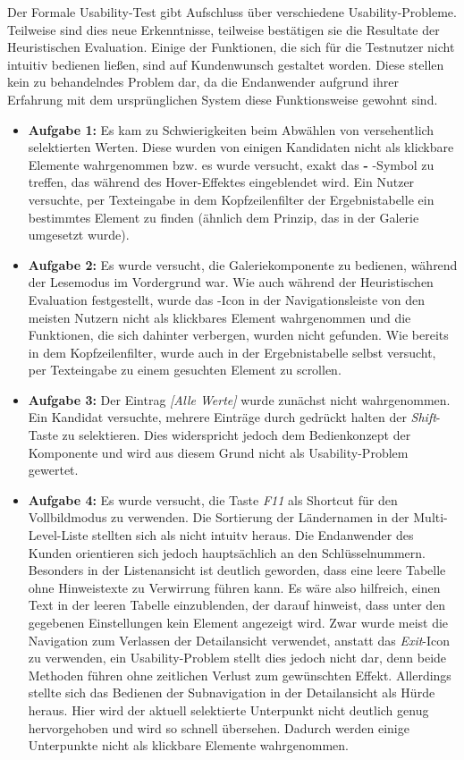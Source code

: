Der Formale Usability-Test gibt Aufschluss über verschiedene Usability-Probleme. Teilweise sind dies neue Erkenntnisse, teilweise bestätigen sie die Resultate der Heuristischen Evaluation. Einige der Funktionen, die sich für die Testnutzer nicht intuitiv bedienen ließen, sind auf Kundenwunsch gestaltet worden. Diese stellen kein zu behandelndes Problem dar, da die Endanwender aufgrund ihrer Erfahrung mit dem ursprünglichen System diese Funktionsweise gewohnt sind.\par
\begin{itemize}
\item \textbf{Aufgabe 1:} Es kam zu Schwierigkeiten beim Abwählen von versehentlich selektierten Werten. Diese wurden von einigen Kandidaten nicht als klickbare Elemente wahrgenommen bzw. es wurde versucht, exakt das \textbf{-} -Symbol zu treffen, das während des Hover-Effektes eingeblendet wird. Ein Nutzer versuchte, per Texteingabe in dem Kopfzeilenfilter der Ergebnistabelle ein bestimmtes Element zu finden (ähnlich dem Prinzip, das in der Galerie umgesetzt wurde).
\item \textbf{Aufgabe 2:} Es wurde versucht, die Galeriekomponente zu bedienen, während der Lesemodus im Vordergrund war. Wie auch während der Heuristischen Evaluation festgestellt, wurde das -Icon in der Navigationsleiste von den meisten Nutzern nicht als klickbares Element wahrgenommen und die Funktionen, die sich dahinter verbergen, wurden nicht gefunden. Wie bereits in dem Kopfzeilenfilter, wurde auch in der Ergebnistabelle selbst versucht, per Texteingabe zu einem gesuchten Element zu scrollen.
\item \textbf{Aufgabe 3:} Der Eintrag \textit{[Alle Werte]} wurde zunächst nicht wahrgenommen. Ein Kandidat versuchte, mehrere Einträge durch gedrückt halten der \textit{Shift}-Taste zu selektieren. Dies widerspricht jedoch dem Bedienkonzept der Komponente und wird aus diesem Grund nicht als Usability-Problem gewertet.
\item \textbf{Aufgabe 4:} Es wurde versucht, die Taste \textit{F11} als Shortcut für den Vollbildmodus zu verwenden. Die Sortierung der Ländernamen in der Multi-Level-Liste stellten sich als nicht intuitv heraus. Die Endanwender des Kunden orientieren sich jedoch hauptsächlich an den Schlüsselnummern. Besonders in der Listenansicht ist deutlich geworden, dass eine leere Tabelle ohne Hinweistexte zu Verwirrung führen kann. Es wäre also hilfreich, einen Text in der leeren Tabelle einzublenden, der darauf hinweist, dass unter den gegebenen Einstellungen kein Element angezeigt wird. Zwar wurde meist die Navigation zum Verlassen der Detailansicht verwendet, anstatt das \textit{Exit}-Icon zu verwenden, ein Usability-Problem stellt dies jedoch nicht dar, denn beide Methoden führen ohne zeitlichen Verlust zum gewünschten Effekt. Allerdings stellte sich das Bedienen der Subnavigation in der Detailansicht als Hürde heraus. Hier wird der aktuell selektierte Unterpunkt nicht deutlich genug hervorgehoben und wird so schnell übersehen. Dadurch werden einige Unterpunkte nicht als klickbare Elemente wahrgenommen.

\end{itemize}
